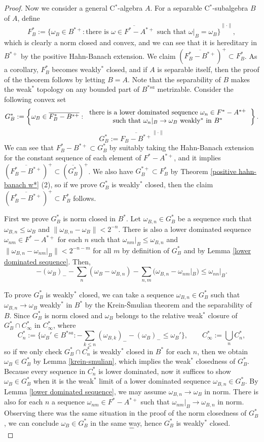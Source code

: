 \documentclass[a4paper]{amsart}
\theoremstyle{plain}
\theoremstyle{definition}
\begin{document}
\begin{proof}
Now we consider a general C$^*$-algebra $A$.
For a separable C$^*$-subalgebra $B$ of $A$, define
\[F_B^*:=\overline{\{\omega_B\in B^{*+}:\text{there is $\omega\in F^*-A^{*+}$ such that $\omega|_B=\omega_B$}\}}^{\|\cdot\|},\]
which is clearly a norm closed and convex, and we can see that it is hereditary in $B^{*+}$ by the positive Hahn-Banach extension.
We claim $(\overline{F_B^*-B^{*+}})^+\subset F_B^*$.
As a corollary, $F_B^*$ becomes weakly$^*$ closed, and if $A$ is separable itself, then the proof of the theorem follows by letting $B=A$.
Note that the separability of $B$ makes the weak$^*$ topology on any bounded part of $B^{*sa}$ metrizable.
Consider the following convex set
\[G_B^*:=\left\{\omega_B\in\overline{F_B^*-B^{*+}}:\begin{tabular}{c}there is a lower dominated sequence $\omega_n\in F^*-A^{*+}$\\such that $\omega_n|_B\to\omega_B$ weakly$^*$ in $B^*$\end{tabular}\right\}.\]
\[G_B^*:=\overline{F_B-B^{*+}}^{\|\cdot\|}\]
We can see that $F_B^*-B^{*+}\subset G_B^*$ by suitably taking the Hahn-Banach extension for the constant sequence of each element of $F^*-A^{*+}$, and it implies $(\overline{F_B^*-B^{*+}})^+\subset(\overline{G_B^*})^+$.
We also have $G_B^{*+}\subset F_B^*$ by Theorem \ref{positive hahn-banach w*} (2), so if we prove $G_B^*$ is weakly$^*$ closed, then the claim $(\overline{F_B^*-B^{*+}})^+\subset F_B^*$ follows.

First we prove $G_B^*$ is norm closed in $B^*$.
Let $\omega_{B,n}\in G_B^*$ be a sequence such that $\omega_{B,n}\le\omega_B$ and $\|\omega_{B,n}-\omega_B\|<2^{-n}$.
There is also a lower dominated sequence $\omega_{nm}\in F^*-A^{*+}$ for each $n$ such that $\omega_{nm}|_B\le\omega_{B,n}$ and $\|\omega_{B,n}-\omega_{nm}|_B\|<2^{-n-m}$ for all $m$ by definition of $G_B^*$ and by Lemma \ref{lower dominated sequence}.
Then,
\[-(\omega_B)_--\sum_n(\omega_B-\omega_{B,n})-\sum_{n,m}(\omega_{B,n}-\omega_{nm}|_B)\le\omega_{nn}|_B.\]


To prove $G_B^*$ is weakly$^*$ closed, we can take a sequence $\omega_{B,n}\in G_B^*$ such that $\omega_{B,n}\to\omega_B$ weakly$^*$ in $B^*$ by the Krein-\v Smulian theorem and the separability of $B$.
Since $G_B^*$ is norm closed and $\omega_B$ belongs to the relative weak$^*$ closure of $G_B^*\cap C_\infty^*$ in $C_\infty^*$, where
\[C_n^*:=\{\omega_B'\in B^{*sa}:-\sum_{k\le n}(\omega_{B,k})_--(\omega_B)_-\le\omega_B'\},\qquad C_\infty^*:=\bigcup_nC_n^*,\]
so if we only check $G^*_B\cap C_n^*$ is weakly$^*$ closed in $B^*$ for each $n$, then we obtain $\omega_B\in G^*_B$ by Lemma \ref{krein-smulian}, which implies the weak$^*$ closedness of $G_B^*$.
Because every sequence in $C_n^*$ is lower dominated, now it suffices to show $\omega_B\in G_B^*$ when it is the weak$^*$ limit of a lower dominated sequence $\omega_{B,n}\in G_B^*$.
By Lemma \ref{lower dominated sequence}, we may assume $\omega_{B,n}\to\omega_B$ in norm.
There is also for each $n$ a sequence $\omega_{nm}\in F^*-A^{*+}$ such that $\omega_{nm}|_B\to\omega_{B,n}$ in norm.
Observing there was the same situation in the proof of the norm closedness of $G_B^*$, we can conclude $\omega_B\in G_B^*$ in the same way, hence $G_B^*$ is weakly$^*$ closed.
\[-\]


\end{proof}
\end{document}
